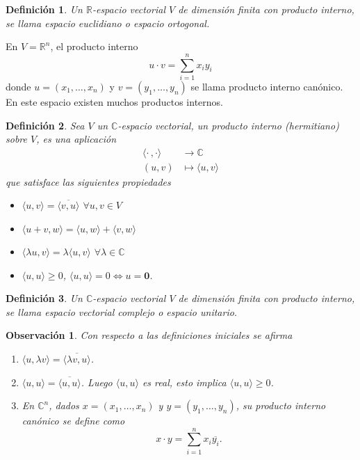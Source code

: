\documentclass[b5paper, 11pt]{book}
\newcommand{\0}{\mathbf{0}}
\newcommand{\R}{\mathds{R}}
\newtheorem{obs}{Observación}[chapter]
\theoremstyle{estiloB}
\theoremstyle{estiloC}
\newtheorem{unadefi}{Definición}[chapter]
\theoremstyle{estiloD}
\begin{document}
\begin{unadefi}
	Un $\R$-espacio vectorial $V$ de dimensión finita con producto interno, se llama espacio euclidiano o espacio ortogonal.
\end{unadefi}

En $V= \R^{n}$, el producto interno
\[
u \cdot v= \sum_{i=1}^{n}x_{i}y_{i} 
\]
donde $u=(x_{1}, \ldots, x_{n})$ y $v=(y_{1}, \ldots , y_{n})$ se llama producto interno canónico. En este espacio existen muchos productos internos.

\begin{unadefi}
	Sea $V$ un $\mathds{C}$-espacio vectorial, un producto interno (hermitiano) sobre $V$, es una aplicación
	\begin{align*}
	\langle \mathbf{\cdot} \, , \mathbf{\cdot} \rangle	&\to \mathds{C}\\
	(u,v)							&\mapsto \langle u, v \rangle
	\end{align*}
	que satisface las siguientes propiedades
	\begin{itemize}
		\item[\textit{i)}] $\langle u,v \rangle = \overline{\langle v,u\rangle}$ $\forall u,v \in V$
		\item[\textit{ii)}] $\langle u+v, w \rangle= \langle u,w \rangle + \langle v,w \rangle$
		\item[\textit{iii)}] $\langle \lambda u, v \rangle= \lambda \langle u,v \rangle$ $\forall \lambda \in \mathds{C}$
		\item[\textit{iv)}] $\langle u,u \rangle \geq 0$, $\langle u,u \rangle=0 \Longleftrightarrow u= \0$.
	\end{itemize}
\end{unadefi}

\begin{unadefi}
	Un $\mathds{C}$-espacio vectorial $V$ de dimensión finita con producto interno, se llama espacio vectorial complejo o espacio unitario.
\end{unadefi}
\begin{obs}Con respecto a las definiciones iniciales se afirma
	\begin{enumerate}
		\item $\langle u, \lambda v \rangle= \overline{\langle \lambda v, u \rangle}$.
		\item $\langle u,u \rangle= \overline{\langle u,u \rangle}$. Luego $\langle u,u \rangle$ es real, esto implica $\langle u,u \rangle \geq 0$.
		\item En $\mathds{C}^{n}$, dados $x= (x_1, \ldots , x_n)$ y $y= (y_{1}, \ldots , y_{n})$, su producto interno canónico se define como
		\[
		x \cdot y= \sum_{i=1}^{n} x_{i}\overline{y_{i}}.
		\]
	\end{enumerate}
\end{obs}
\end{document}
